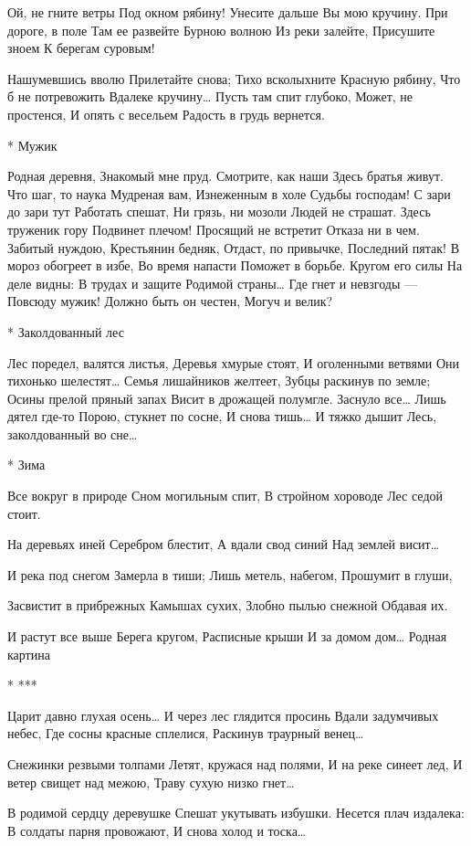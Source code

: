 Ой, не гните ветры
Под окном рябину!
Унесите дальше
Вы мою кручину.
При дороге, в поле
Там ее развейте
Бурною волною
Из реки залейте,
Присушите зноем
К берегам суровым!

Нашумевшись вволю
Прилетайте снова;
Тихо всколыхните
Красную рябину,
Что б не потревожить
Вдалеке кручину…
Пусть там спит глубоко,
Может, не простенся,
И опять с весельем
Радость в грудь вернется.


* Мужик

Родная деревня,
Знакомый мне пруд.
Смотрите, как наши
Здесь братья живут.
Что шаг, то наука
Мудреная вам,
Изнеженным в холе
Судьбы господам!
С зари до зари тут
Работать спешат,
Ни грязь, ни мозоли
Людей не страшат.
Здесь труженик гору
Подвинет плечом!
Просящий не встретит
Отказа ни в чем.
Забитый нуждою,
Крестьянин бедняк,
Отдаст, по привычке,
Последний пятак!
В мороз обогреет в избе,
Во время напасти
Поможет в борьбе.
Кругом его силы
На деле видны:
В трудах и защите
Родимой страны…
Где гнет и невзгоды —
Повсюду мужик!
Должно быть он честен,
Могуч и велик?


* Заколдованный лес

Лес поредел, валятся листья,
Деревья хмурые стоят,
И оголенными ветвями
Они тихонько шелестят…
Семья лишайников желтеет,
Зубцы раскинув по земле;
Осины прелой пряный запах
Висит в дрожащей полумгле.
Заснуло все… Лишь дятел где-то
Порою, стукнет по сосне,
И снова тишь… И тяжко дышит
Лесь, заколдованный во сне…


* Зима

Все вокруг в природе
Сном могильным спит,
В стройном хороводе
Лес седой стоит.

На деревьях иней
Серебром блестит,
А вдали свод синий
Над землей висит…

И река под снегом
Замерла в тиши;
Лишь метель, набегом,
Прошумит в глуши,

Засвистит в прибрежных
Камышах сухих,
Злобно пылью снежной
Обдавая их.

И растут все выше
Берега кругом,
Расписные крыши
И за домом дом…
Родная картина


* ***

Царит давно глухая осень…
И через лес глядится просинь
Вдали задумчивых небес,
Где сосны красные сплелися,
Раскинув траурный венец…

Снежинки резвыми толпами
Летят, кружася над полями,
И на реке синеет лед,
И ветер свищет над межою,
Траву сухую низко гнет…

В родимой сердцу деревушке
Спешат укутывать избушки.
Несется плач издалека:
В солдаты парня провожают,
И снова холод и тоска…


